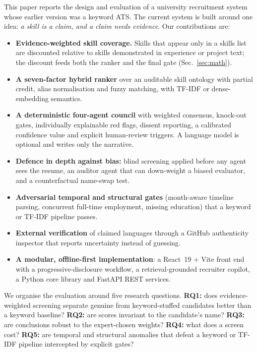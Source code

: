 \documentclass[conference]{IEEEtran}
\begin{document}
This paper reports the design and evaluation of a university recruitment system whose earlier version was a keyword ATS. The current system is built around one idea: \emph{a skill is a claim, and a claim needs evidence}. Our contributions are:
\begin{itemize}
\item \textbf{Evidence-weighted skill coverage.} Skills that appear only in a skills list are discounted relative to skills demonstrated in experience or project text; the discount feeds both the ranker and the final gate (Sec.~\ref{sec:math}).
\item \textbf{A seven-factor hybrid ranker} over an auditable skill ontology with partial credit, alias normalisation and fuzzy matching, with TF-IDF or dense-embedding semantics.
\item \textbf{A deterministic four-agent council} with weighted consensus, knock-out gates, individually explainable red flags, dissent reporting, a calibrated confidence value and explicit human-review triggers. A language model is optional and writes only the narrative.
\item \textbf{Defence in depth against bias:} blind screening applied before any agent sees the resume, an auditor agent that can down-weight a biased evaluator, and a counterfactual name-swap test.
\item \textbf{Adversarial temporal and structural gates} (month-aware timeline parsing, concurrent full-time employment, missing education) that a keyword or TF-IDF pipeline passes.
\item \textbf{External verification} of claimed languages through a GitHub authenticity inspector that reports uncertainty instead of guessing.
\item \textbf{A modular, offline-first implementation}: a React~19 + Vite front end with a progressive-disclosure workflow, a retrieval-grounded recruiter copilot, a Python core library and FastAPI REST services.
\end{itemize}

We organise the evaluation around five research questions. \textbf{RQ1:} does evidence-weighted screening separate genuine from keyword-stuffed candidates better than a keyword baseline? \textbf{RQ2:} are scores invariant to the candidate's name? \textbf{RQ3:} are conclusions robust to the expert-chosen weights? \textbf{RQ4:} what does a screen cost? \textbf{RQ5:} are temporal and structural anomalies that defeat a keyword or TF-IDF pipeline intercepted by explicit gates?
\end{document}
